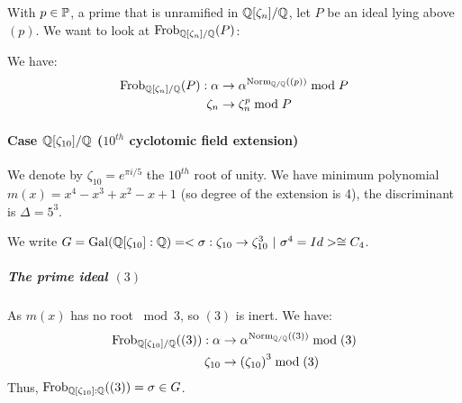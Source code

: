 With $p \in \primes$, a prime that is unramified in $\Q[\zeta_n]/\Q$, let $P$ be an ideal lying above $(p)$.
We want to look at $\Frob{\Q[\zeta_n]/\Q}{P}$:

We have:
\begin{align*}
	\Frob{\Q[\zeta_n]/\Q}{P}: 
	\alpha&\to \alpha^{\Norm[\Q/\Q]{(p)}} \bmod P\\
	\zeta_n&\to \zeta_n^p \bmod P
\end{align*}

\paragraph{Case $\Q[\zeta_{10}]/\Q$ ($10^{th}$ cyclotomic field extension)}
We denote by $\zeta_{10}=e^{\pi i/5}$ the $10^{th}$ root of unity.
We have minimum polynomial $m(x) = x^4-x^3+x^2-x+1$ (so degree of the extension is 4), the discriminant is $\Delta = 5^3$.

We write $
G = \Gal{\Q[\zeta_{10}]:\Q} 
= < \sigma: \zeta_{10} \to \zeta_{10}^3 \ | \ \sigma^4 = Id > \cong C_4$.




\subparagraph{The prime ideal $(3)$}
As $m(x)$ has no root $\bmod 3$, so $(3)$ is inert.
We have:
\begin{align*}
	\Frob{\Q[\zeta_{10}]/\Q}{(3)}:
	\alpha   &\to \alpha^{\Norm[\Q/\Q]{(3)}} \bmod (3)\\
	\zeta_{10} &\to \left( \zeta_{10} \right)^3 \bmod (3)
\end{align*}
Thus, $\Frob{\Q[\zeta_{10}]:\Q}{(3)} = \sigma \in G$.


